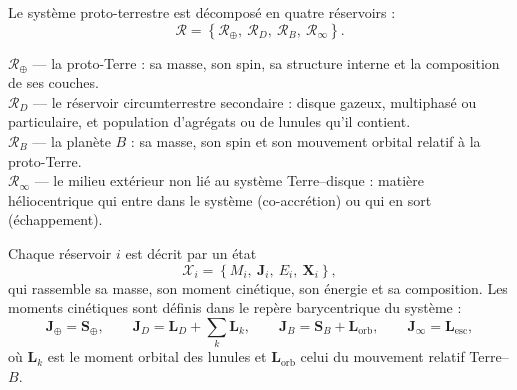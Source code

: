 \documentclass[11pt,a4paper,openany]{report}
\newcommand{\RT}{\mathcal{R}_{\oplus}}
\newcommand{\RD}{\mathcal{R}_{D}}
\newcommand{\RB}{\mathcal{R}_{B}}
\newcommand{\Rinf}{\mathcal{R}_{\infty}}
\begin{document}
Le système proto-terrestre est décomposé en quatre réservoirs :
\begin{equation}
\mathcal{R}=\left\{\RT,\ \RD,\ \RB,\ \Rinf\right\}.
\label{eq:reservoirs}
\end{equation}

\begin{definition}
\textbf{$\RT$} --- la proto-Terre : sa masse, son spin, sa structure interne et la composition de ses
couches.\\
\textbf{$\RD$} --- le réservoir circumterrestre secondaire : disque gazeux, multiphasé ou particulaire,
et population d'agrégats ou de lunules qu'il contient.\\
\textbf{$\RB$} --- la planète $B$ : sa masse, son spin et son mouvement orbital relatif à la
proto-Terre.\\
\textbf{$\Rinf$} --- le milieu extérieur non lié au système Terre--disque : matière héliocentrique
qui entre dans le système (co-accrétion) ou qui en sort (échappement).
\end{definition}

Chaque réservoir $i$ est décrit par un état
\begin{equation}
\mathcal{X}_i=\left\{M_i,\ \mathbf{J}_i,\ E_i,\ \mathbf{X}_i\right\},
\label{eq:etat-reservoir}
\end{equation}
qui rassemble sa masse, son moment cinétique, son énergie et sa composition. Les moments
cinétiques sont définis dans le repère barycentrique du système :
\begin{equation}
\mathbf{J}_\oplus=\mathbf{S}_\oplus,\qquad
\mathbf{J}_D=\mathbf{L}_D+\sum_k\mathbf{L}_k,\qquad
\mathbf{J}_B=\mathbf{S}_B+\mathbf{L}_{\mathrm{orb}},\qquad
\mathbf{J}_\infty=\mathbf{L}_{\mathrm{esc}},
\label{eq:J-reservoirs}
\end{equation}
où $\mathbf{L}_k$ est le moment orbital des lunules et $\mathbf{L}_{\mathrm{orb}}$ celui du
mouvement relatif Terre--$B$.
\end{document}
